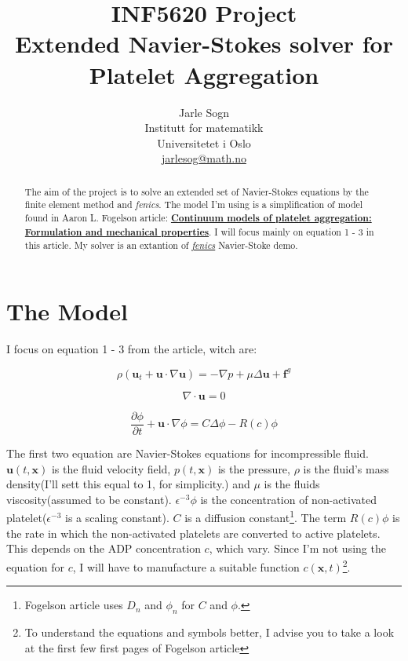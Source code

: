 \documentclass[12pt,a4paper,english]{article}
\title{INF5620 Project\\ Extended Navier-Stokes solver for Platelet Aggregation}
\author{Jarle Sogn\\ Institutt for matematikk\\
Universitetet i Oslo\\ \url{jarlesog@math.no}}
\begin{document}
\maketitle

\begin{abstract}
The aim of the project is to solve an extended set of Navier-Stokes equations by the finite element method and \textit{fenics}. The model I'm using is a simplification of model found in Aaron L. Fogelson article: \href{http://www.jstor.org/stable/2102193}{\textbf{Continuum models of platelet aggregation: Formulation and mechanical properties}}. I will focus mainly on equation 1 - 3 in this article. My solver is an extantion of \href{http://fenicsproject.org/documentation/dolfin/1.0.0/python/demo/pde/navier-stokes/python/documentation.html}{\textit{fenics}} Navier-Stoke demo.

\end{abstract}

\section*{The Model}

I focus on equation 1 - 3 from the article, witch are:

\begin{equation}
\rho \left(\textbf{u}_t + \textbf{u} \cdot \nabla \textbf{u} \right) = -\nabla p + \mu \Delta \textbf{u} + \textbf{f}^g 
\label{eq:MainNS}
\end{equation}
 
\begin{equation}
\nabla \cdot \textbf{u} = 0
\label{eq:MainIncompressible}
\end{equation}

\begin{equation}
\frac{\partial \phi}{\partial t} + \textbf{u} \cdot \nabla \phi = C\Delta \phi - R\left( c \right)\phi 
\label{eq:MainPhi}
\end{equation}

The first two equation are Navier-Stokes equations for incompressible fluid. $\textbf{u}\left(t, \textbf{x} \right)$ is the fluid velocity field, $p\left(t, \textbf{x} \right)$ is the pressure, $\rho$ is the fluid's mass density(I'll sett this equal to 1, for simplicity.) and $\mu$ is the fluids viscosity(assumed to be constant). $\epsilon^{-3} \phi$ is the concentration of non-activated platelet($\epsilon^{-3}$ is a scaling constant). $C$ is a diffusion constant\footnote{Fogelson article uses $D_n$ and $\phi_n$ for $C$ and $\phi$.}. The term $R\left( c \right)\phi$ is the rate in which the non-activated platelets are converted to active platelets. This depends on the ADP concentration $c$, which vary. Since I'm not using the equation for $c$, I will have to manufacture a suitable function $c\left( \textbf{x}, t\right)$\footnote{To understand the equations and symbols better, I advise you to take a look at the first few first pages of Fogelson article}.     	
\end{document}
